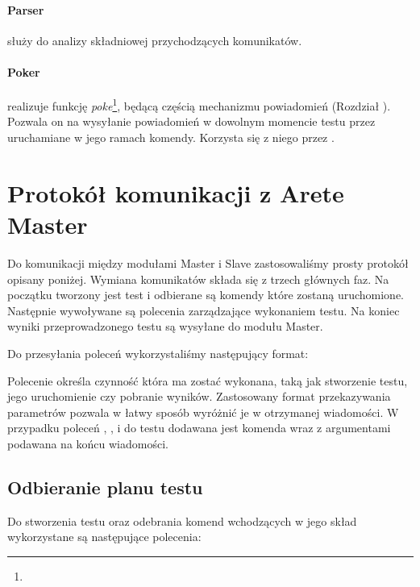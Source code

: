 \documentclass[00-praca-magisterska.tex]{subfiles}
\begin{document}
\paragraph{Parser} służy do analizy składniowej przychodzących komunikatów.

\paragraph{Poker} realizuje funkcję \emph{poke}\footnote{}, będącą
częścią mechanizmu powiadomień (Rozdział ).
Pozwala on na wysyłanie powiadomień w dowolnym momencie testu przez uruchamiane
w jego ramach komendy. Korzysta się z niego przez .

\section{Protokół komunikacji z Arete Master}
\label{arete-slave-protokol}

Do komunikacji między modułami Master i Slave zastosowaliśmy prosty protokół
opisany poniżej. Wymiana komunikatów składa się z trzech głównych faz. Na
początku tworzony jest test i odbierane są komendy które zostaną uruchomione.
Następnie wywoływane są polecenia zarządzające wykonaniem testu.  Na koniec
wyniki przeprowadzonego testu są wysyłane do modułu Master. 

Do przesyłania poleceń wykorzystaliśmy następujący format:


Polecenie określa czynność która ma zostać wykonana, taką jak stworzenie testu,
jego uruchomienie czy pobranie wyników. Zastosowany format przekazywania
parametrów  pozwala w łatwy sposób wyróżnić je w otrzymanej
wiadomości. W przypadku poleceń , ,  i
 do testu dodawana jest komenda wraz z argumentami podawana na końcu
wiadomości.

\subsection{Odbieranie planu testu}

Do stworzenia testu oraz odebrania komend wchodzących w jego skład wykorzystane
są następujące polecenia:
\end{document}
